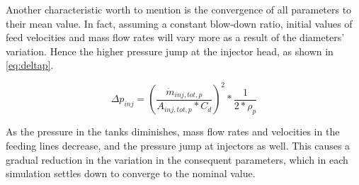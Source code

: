 Another characteristic worth to mention is the convergence of all parameters to their mean value. In fact, assuming a constant blow-down ratio, initial values of feed velocities and mass flow rates will vary more as a result of the diameters' variation. Hence the higher pressure jump at the injector head, as shown in \autoref{eq:deltap}.


\begin{equation}
    \Delta p_{inj} = \left(\frac{\dot m_{inj,tot,p}}{A_{inj,tot,p} * C_d}\right)^2 * \frac{1}{2*\rho _p}
    \label{eq:deltap}
\end{equation}



As the pressure in the tanks diminishes, mass flow rates and velocities in the feeding lines decrease, and the pressure jump at injectors as well. This causes a gradual reduction in the variation in the consequent parameters, which in each simulation settles down to converge to the nominal value. 










